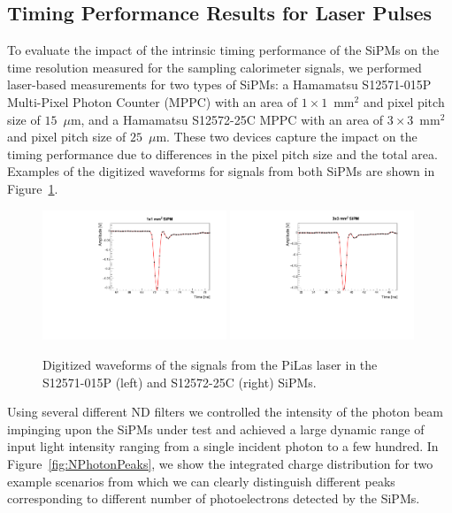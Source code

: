 \subsection{Timing Performance Results for Laser Pulses}
\label{sec:lasertiming}

To evaluate the impact of the intrinsic timing performance of the SiPMs
on the time resolution measured for the sampling calorimeter signals, 
we performed laser-based measurements for two types of SiPMs: a Hamamatsu
S12571-015P Multi-Pixel Photon Counter (MPPC) with an area of $1\times
1$~$\mathrm{mm}^{2}$ and pixel pitch size of $15$~$\mu$m, and a Hamamatsu
S12572-25C MPPC with an area of $3\times 3$~$\mathrm{mm}^{2}$ and pixel pitch
size of $25$~$\mu$m. These two devices capture the impact on the timing performance due to differences 
in the pixel pitch size and the total area. Examples of the digitized waveforms for signals from both
SiPMs are shown in Figure~\ref{fig:pulses}.

\begin{figure}[htbp] 
\centering
\includegraphics[width=0.49\textwidth]{figures/PulseShapeExample_1x1SiPM.pdf} 
\includegraphics[width=0.49\textwidth]{figures/PulseShapeExample_3x3SiPM.pdf} 
\caption{Digitized waveforms of the signals from the PiLas laser 
in the S12571-015P (left) and S12572-25C (right) SiPMs.} 
\label{fig:pulses} 
\end{figure} 

Using several different ND filters we controlled the intensity of the photon 
beam impinging upon the SiPMs under test and achieved a large dynamic range 
of input light intensity ranging from a single incident photon to a few hundred. In 
Figure~\ref{fig:NPhotonPeaks}, we show the integrated charge distribution
for two example scenarios from which we can clearly distinguish different peaks
corresponding to different number of photoelectrons detected by the SiPMs.

